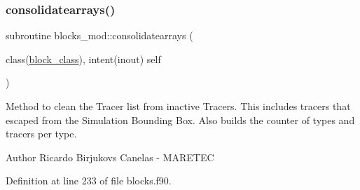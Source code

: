 \subsubsection{\texorpdfstring{consolidatearrays()}{consolidatearrays()}}
{\footnotesize\ttfamily subroutine blocks\+\_\+mod\+::consolidatearrays (\begin{DoxyParamCaption}\item[{class(\mbox{\hyperlink{structblocks__mod_1_1block__class}{block\+\_\+class}}), intent(inout)}]{self }\end{DoxyParamCaption})\hspace{0.3cm}{\ttfamily [private]}}



Method to clean the Tracer list from inactive Tracers. This includes tracers that escaped from the Simulation Bounding Box. Also builds the counter of types and tracers per type. 

\begin{DoxyAuthor}{Author}
Ricardo Birjukovs Canelas -\/ M\+A\+R\+E\+T\+EC 
\end{DoxyAuthor}


Definition at line 233 of file blocks.\+f90.


